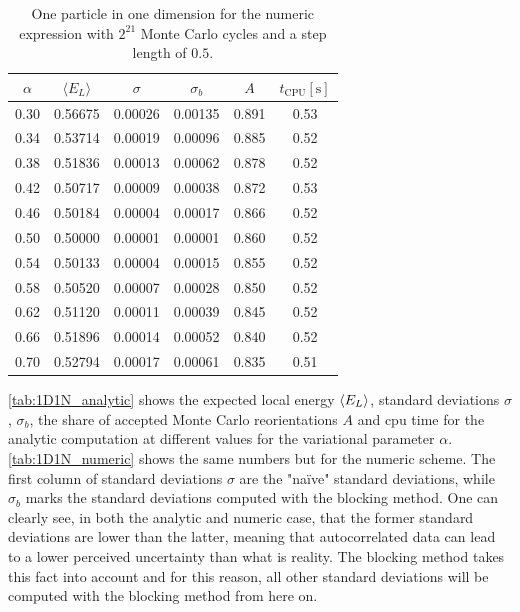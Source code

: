 \documentclass[
    a4paper, aps, twocolumn, floatfix, superscriptaddress,
    nofootinbib]{revtex4-1}
\newcommand{\1}{\mathds{1}}
\begin{document}
        \begin{table}
            \centering
            \caption{One particle in one dimension for the numeric expression
            with $2^{21}$ Monte Carlo cycles and a step length of $0.5$.}
            \begin{ruledtabular}
                \begin{tabular}{cccccc}
                    $\alpha$ & $\langle  E_L\rangle$ & $\sigma$ & $\sigma_b$
                    & $A$&$t_{\text{CPU}} [\si{\second}]$ \\
                    \hline
                    0.30&0.56675&0.00026&0.00135&0.891&0.53\\
                    0.34&0.53714&0.00019&0.00096&0.885&0.52\\
                    0.38&0.51836&0.00013&0.00062&0.878&0.52\\
                    0.42&0.50717&0.00009&0.00038&0.872&0.53\\
                    0.46&0.50184&0.00004&0.00017&0.866&0.52\\
                    0.50&0.50000&0.00001&0.00001&0.860&0.52\\
                    0.54&0.50133&0.00004&0.00015&0.855&0.52\\
                    0.58&0.50520&0.00007&0.00028&0.850&0.52\\
                    0.62&0.51120&0.00011&0.00039&0.845&0.52\\
                    0.66&0.51896&0.00014&0.00052&0.840&0.52\\
                    0.70&0.52794&0.00017&0.00061&0.835&0.51\\
                \end{tabular}
            \end{ruledtabular}
            \label{tab:1D1N_numeric}
        \end{table}

        \autoref{tab:1D1N_analytic} shows the expected local energy
        $\expval{E_L}$, standard deviations $\sigma$, $\sigma_b$, the share of
        accepted Monte Carlo reorientations $A$ and cpu time for the analytic
        computation at different values for the variational parameter $\alpha$.
        \autoref{tab:1D1N_numeric} shows the same numbers but for the numeric
        scheme. The first column of standard deviations $\sigma$ are the "naïve"
        standard deviations, while $\sigma_b$ marks the standard deviations
        computed with the blocking method. One can clearly see, in both the
        analytic and numeric case, that the former standard deviations are lower
        than the latter, meaning that autocorrelated data can lead to a lower
        perceived uncertainty than what is reality. The blocking method takes
        this fact into account and for this reason, all other standard
        deviations will be computed with the blocking method from here on.
\end{document}
